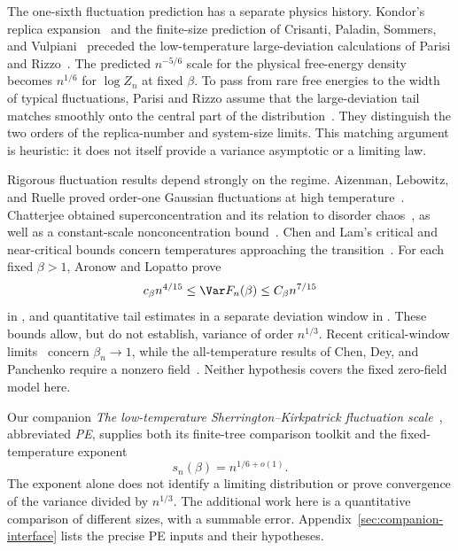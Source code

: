 The one-sixth fluctuation prediction has a separate physics history.
Kondor's replica expansion~\cite{Kondor1983} and the finite-size
prediction of Crisanti, Paladin, Sommers, and Vulpiani~\cite{CPSV1992}
preceded the low-temperature large-deviation calculations of Parisi
and Rizzo~\cite{ParisiRizzo2008,ParisiRizzo2009}. The predicted
$n^{-5/6}$ scale for the physical free-energy density becomes
$n^{1/6}$ for $\log Z_n$ at fixed $\beta$. To pass from rare
free energies to the width of typical fluctuations, Parisi and Rizzo
assume that the large-deviation tail matches smoothly onto the
central part of the distribution~\cite[Section~VI]{ParisiRizzo2009}.
They distinguish the two orders of the replica-number and system-size
limits. This matching argument is heuristic: it does not itself
provide a variance asymptotic or a limiting law.

Rigorous fluctuation results depend strongly on the regime.
Aizenman, Lebowitz, and Ruelle proved order-one Gaussian fluctuations
at high temperature~\cite{AizenmanLebowitzRuelle1987}.
Chatterjee obtained superconcentration and its relation to disorder
chaos~\cite{Chatterjee2009}, as well as a constant-scale
nonconcentration bound~\cite{Chatterjee2019LowerBounds}.
Chen and Lam's critical and near-critical bounds concern temperatures
approaching the transition~\cite{ChenLam2019Critical}.
For each fixed $\beta>1$, Aronow and Lopatto prove
\[
 c_\beta n^{4/15}\le \Var F_n(\beta)\le C_\beta n^{7/15}
\]
in \cite[Theorem~1.4]{AL2026}, and quantitative tail estimates in a
separate deviation window in \cite[Theorem~1.5]{AL2026}.
These bounds allow, but do not establish, variance of order $n^{1/3}$.
Recent critical-window limits~\cite[Theorem~2.1]{ChengLiuShaoXu2026CriticalWindow}
concern $\beta_n\to1$, while the all-temperature results of
Chen, Dey, and Panchenko require a nonzero field~\cite{ChenDeyPanchenko2017}.
Neither hypothesis covers the fixed zero-field model here.

Our companion \emph{The low-temperature Sherrington--Kirkpatrick
fluctuation scale}~\cite{PE}, abbreviated \emph{PE}, supplies both its
finite-tree comparison toolkit and the fixed-temperature exponent
\begin{equation}\label{eq:PE-exponent}
 s_n(\beta)=n^{1/6+o(1)}.
\end{equation}
The exponent alone does not identify a limiting distribution or prove
convergence of the variance divided by $n^{1/3}$. The additional work
here is a quantitative comparison of different sizes, with a summable
error. Appendix~\ref{sec:companion-interface} lists the precise PE
inputs and their hypotheses.

